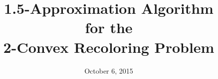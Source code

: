 \title{
1.5-Approximation Algorithm \\
for the \\
2-Convex Recoloring Problem
}
\date{October 6, 2015}
\begin{frame}
\titlepage
\end{frame}
